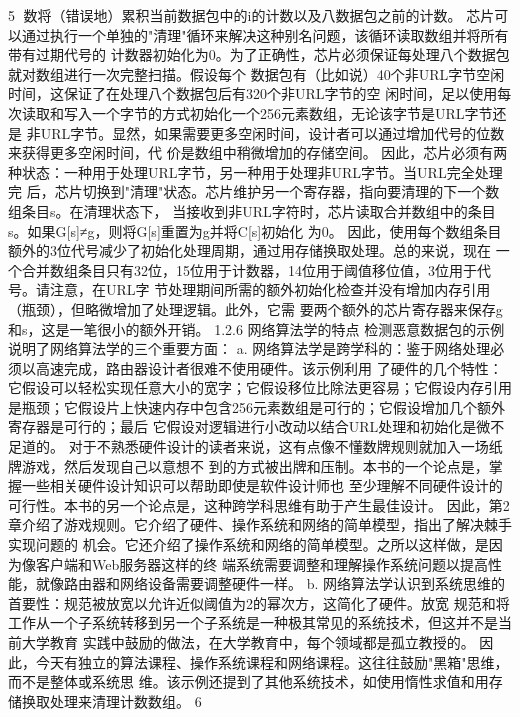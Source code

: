                                                    5
数将（错误地）累积当前数据包中的i的计数以及八数据包之前的计数。
芯片可以通过执行一个单独的"清理"循环来解决这种别名问题，该循环读取数组并将所有带有过期代号的
计数器初始化为0。为了正确性，芯片必须保证每处理八个数据包就对数组进行一次完整扫描。假设每个
数据包有（比如说）40个非URL字节空闲时间，这保证了在处理八个数据包后有320个非URL字节的空
闲时间，足以使用每次读取和写入一个字节的方式初始化一个256元素数组，无论该字节是URL字节还是
非URL字节。显然，如果需要更多空闲时间，设计者可以通过增加代号的位数来获得更多空闲时间，代
价是数组中稍微增加的存储空间。
因此，芯片必须有两种状态：一种用于处理URL字节，另一种用于处理非URL字节。当URL完全处理完
后，芯片切换到"清理"状态。芯片维护另一个寄存器，指向要清理的下一个数组条目s。在清理状态下，
当接收到非URL字符时，芯片读取合并数组中的条目s。如果G[s]≠g，则将G[s]重置为g并将C[s]初始化
为0。
因此，使用每个数组条目额外的3位代号减少了初始化处理周期，通过用存储换取处理。总的来说，现在
一个合并数组条目只有32位，15位用于计数器，14位用于阈值移位值，3位用于代号。请注意，在URL字
节处理期间所需的额外初始化检查并没有增加内存引用（瓶颈），但略微增加了处理逻辑。此外，它需
要两个额外的芯片寄存器来保存g和s，这是一笔很小的额外开销。
1.2.6 网络算法学的特点
检测恶意数据包的示例说明了网络算法学的三个重要方面：
a. 网络算法学是跨学科的：鉴于网络处理必须以高速完成，路由器设计者很难不使用硬件。该示例利用
了硬件的几个特性：它假设可以轻松实现任意大小的宽字；它假设移位比除法更容易；它假设内存引用
是瓶颈；它假设片上快速内存中包含256元素数组是可行的；它假设增加几个额外寄存器是可行的；最后
它假设对逻辑进行小改动以结合URL处理和初始化是微不足道的。
对于不熟悉硬件设计的读者来说，这有点像不懂数牌规则就加入一场纸牌游戏，然后发现自己以意想不
到的方式被出牌和压制。本书的一个论点是，掌握一些相关硬件设计知识可以帮助即使是软件设计师也
至少理解不同硬件设计的可行性。本书的另一个论点是，这种跨学科思维有助于产生最佳设计。
因此，第2章介绍了游戏规则。它介绍了硬件、操作系统和网络的简单模型，指出了解决棘手实现问题的
机会。它还介绍了操作系统和网络的简单模型。之所以这样做，是因为像客户端和Web服务器这样的终
端系统需要调整和理解操作系统问题以提高性能，就像路由器和网络设备需要调整硬件一样。
b. 网络算法学认识到系统思维的首要性：规范被放宽以允许近似阈值为2的幂次方，这简化了硬件。放宽
规范和将工作从一个子系统转移到另一个子系统是一种极其常见的系统技术，但这并不是当前大学教育
实践中鼓励的做法，在大学教育中，每个领域都是孤立教授的。
因此，今天有独立的算法课程、操作系统课程和网络课程。这往往鼓励"黑箱"思维，而不是整体或系统思
维。该示例还提到了其他系统技术，如使用惰性求值和用存储换取处理来清理计数数组。
                                                     6
